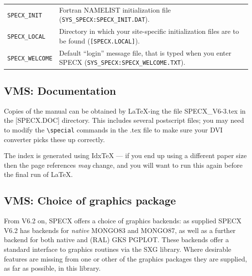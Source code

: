 \documentclass[11pt,twoside]{report}
\begin{document}
\begin{tabular}{ll}
\verb+SPECX_INIT+ &     \begin{minipage}[t]{4.5in}
                        Fortran NAMELIST initialization file
                        (\verb+SYS_SPECX:SPECX_INIT.DAT+).
                        \end{minipage}\\
\verb+SPECX_LOCAL+ &    \begin{minipage}[t]{4.5in}
                        Directory in which your site-specific initialization
                        files are to be found (\verb+[SPECX.LOCAL]+).
                        \end{minipage}\\
\verb+SPECX_WELCOME+ &  \begin{minipage}[t]{4.5in}
                        Default ``login'' message file, that is typed when
                        you enter SPECX (\verb+SYS_SPECX:SPECX_WELCOME.TXT+).
                        \end{minipage}\\
\end{tabular}
      
\subsection{VMS: Documentation}

Copies of the manual can be obtained by {\LaTeX}-ing the file
SPECX\_V6-3.tex in the [SPECX.DOC] directory. This includes
several postscript files; you may need to modify the \verb+\special+
commands in the .tex file to make sure your DVI converter picks
these up correctly.

The index is generated using Idx{\TeX} --- if you end up using a
different paper size then the page references {\em may} change, and
you will want to run this again before the final run of \LaTeX.


\subsection{VMS: Choice of graphics package}

From V6.2 on, SPECX offers a choice of graphics backends: as supplied
SPECX V6.2 has backends for {\em native} MONGO83 and MONGO87, as well
as a further backend for both native and (RAL) GKS PGPLOT. These backends
offer a standard interface to graphics routines via the SXG library. Where
desirable features are missing from one or other of the graphics packages
they are supplied, as far as possible, in this library.
\end{document}
